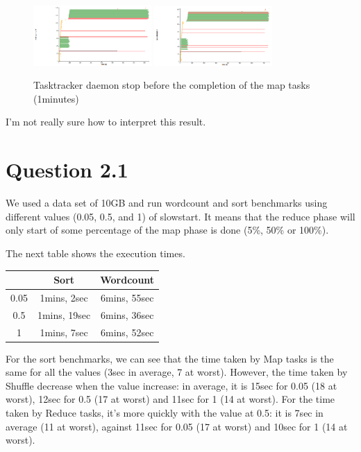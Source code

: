 \documentclass{article}
\begin{document}
\begin{figure}%
  \centering
  \includegraphics[width=0.4\textwidth]{expiry1before.png}
  \includegraphics[width=0.4\textwidth]{expiry1after.png}
  \caption{Tasktracker daemon stop before the completion of the map tasks (1minutes)}
  \label{kill}
\end{figure}




I'm not really sure how to interpret this result.

\section*{Question 2.1}


We used a data set of 10GB and run wordcount and sort benchmarks using
different values (0.05, 0.5, and 1) of slowstart.
It means that the reduce phase will only start of some percentage of the map phase is done (5\%, 50\% or 100\%).

The next table shows the execution times.

\begin{center}
\begin{tabular}{|c|c|c|}
\hline
\ & Sort & Wordcount \\
\hline
0.05 & 1mins, 2sec & 6mins, 55sec \\
\hline
0.5 & 1mins, 19sec & 6mins, 36sec \\
\hline
1 & 1mins, 7sec & 6mins, 52sec \\
\hline
\end{tabular}
\end{center}

For the sort benchmarks, we can see that the time taken by Map tasks is the same for all the values (3sec in average, 7 at worst).
However, the time taken by Shuffle decrease when the value increase: in average, it is 15sec for 0.05 (18 at worst), 12sec for 0.5 (17 at worst) and 11sec for 1 (14 at worst). For the time taken by Reduce tasks, it's more quickly with the value at 0.5: it is 7sec in average (11 at worst), against 11sec for 0.05 (17 at worst) and 10sec for 1 (14 at worst).
\end{document}
